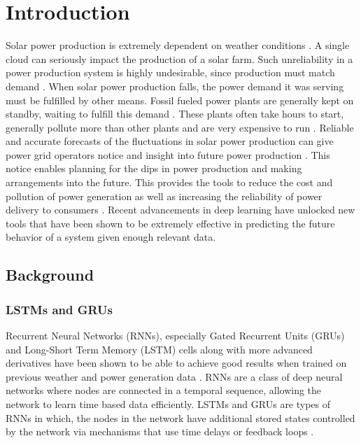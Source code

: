 \chapter{Introduction\label{cha:introduction}}

Solar power production is extremely dependent on weather conditions \cite{lin_temporal_2020, lee_forecasting_2018, jaidee_very_2019, su_machine_2019, jang_solar_2016}. A single cloud can seriously impact the production of a solar farm. Such unreliability in a power production system is highly undesirable, since production must match demand \cite{lee_forecasting_2018}. When solar power production falls, the power demand it was serving must be fulfilled by other means. Fossil fueled power plants are generally kept on standby, waiting to fulfill this demand \cite{lee_forecasting_2018}. These plants often take hours to start, generally pollute more than other plants and are very expensive to run \cite{lee_forecasting_2018}.
Reliable and accurate forecasts of the fluctuations in solar power production can give power grid operators notice and insight into future power production \cite{lee_forecasting_2018}. This notice enables planning for the dips in power production and making arrangements into the future. This provides the tools to reduce the cost and pollution of power generation as well as increasing the reliability of power delivery to consumers \cite{lee_forecasting_2018}.
Recent advancements in deep learning have unlocked new tools that have been shown to be extremely effective in predicting the future behavior of a system given enough relevant data.\\


\section{Background}

\subsection{LSTMs and GRUs}
Recurrent Neural Networks (RNNs), especially Gated Recurrent Units (GRUs) and Long-Short Term Memory (LSTM) cells \cite{Goodfellow-et-al-2016} along with more advanced derivatives have been shown to be able to achieve good results when trained on previous weather and power generation data \cite{lin_temporal_2020, lee_forecasting_2018, jaidee_very_2019, su_machine_2019}.
RNNs are a class of deep neural networks where nodes are connected in a temporal sequence, allowing the network to learn time based data efficiently. LSTMs and GRUs are types of RNNs in which, the nodes in the network have additional stored states controlled by the network via mechanisms that use time delays or feedback loops \cite{Goodfellow-et-al-2016, noauthor_recurrent_2021}.\\

